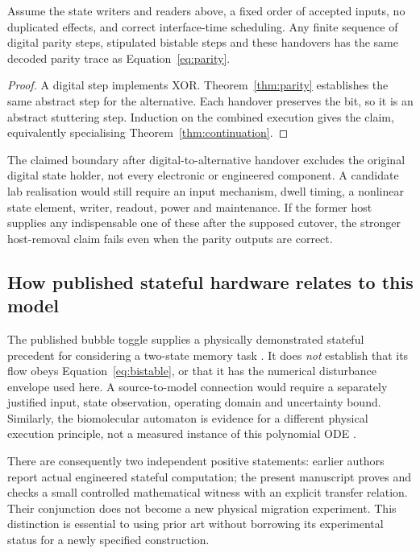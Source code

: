 \begin{corollary}\label{cor:paritymigration}
Assume the state writers and readers above, a fixed order of accepted inputs, no duplicated effects, and correct interface-time scheduling. Any finite sequence of digital parity steps, stipulated bistable steps and these handovers has the same decoded parity trace as Equation~\eqref{eq:parity}.
\end{corollary}
\begin{proof}
A digital step implements XOR. Theorem~\ref{thm:parity} establishes the same abstract step for the alternative. Each handover preserves the bit, so it is an abstract stuttering step. Induction on the combined execution gives the claim, equivalently specialising Theorem~\ref{thm:continuation}.
\end{proof}
The claimed boundary after digital-to-alternative handover excludes the original digital state holder, not every electronic or engineered component. A candidate lab realisation would still require an input mechanism, dwell timing, a nonlinear state element, writer, readout, power and maintenance. If the former host supplies any indispensable one of these after the supposed cutover, the stronger host-removal claim fails even when the parity outputs are correct.

\subsection{How published stateful hardware relates to this model}
The published bubble toggle supplies a physically demonstrated stateful precedent for considering a two-state memory task \citep{bubble}. It does \emph{not} establish that its flow obeys Equation~\eqref{eq:bistable}, or that it has the numerical disturbance envelope used here. A source-to-model connection would require a separately justified input, state observation, operating domain and uncertainty bound. Similarly, the biomolecular automaton is evidence for a different physical execution principle, not a measured instance of this polynomial ODE \citep{benenson}.

There are consequently two independent positive statements: earlier authors report actual engineered stateful computation; the present manuscript proves and checks a small controlled mathematical witness with an explicit transfer relation. Their conjunction does not become a new physical migration experiment. This distinction is essential to using prior art without borrowing its experimental status for a newly specified construction.

